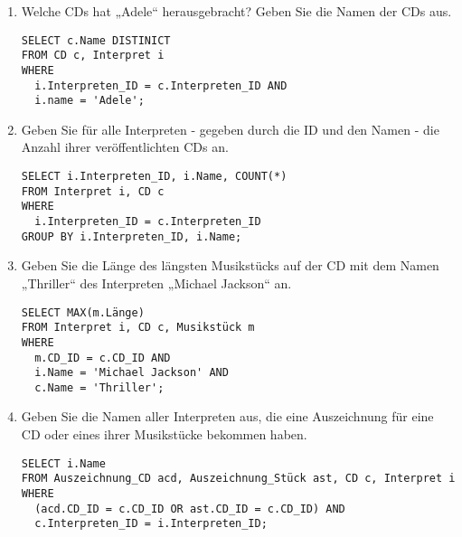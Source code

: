 \documentclass{lehramt-informatik-aufgabe}
\begin{document}
\begin{enumerate}


\item Welche CDs hat „Adele“ herausgebracht? Geben Sie die Namen der CDs
aus.

\begin{antwort}
\begin{verbatim}
SELECT c.Name DISTINICT
FROM CD c, Interpret i
WHERE
  i.Interpreten_ID = c.Interpreten_ID AND
  i.name = 'Adele';
\end{verbatim}
\end{antwort}


\item Geben Sie für alle Interpreten - gegeben durch die ID und den
Namen - die Anzahl ihrer veröffentlichten CDs an.

\begin{antwort}
\begin{verbatim}
SELECT i.Interpreten_ID, i.Name, COUNT(*)
FROM Interpret i, CD c
WHERE
  i.Interpreten_ID = c.Interpreten_ID
GROUP BY i.Interpreten_ID, i.Name;
\end{verbatim}
\end{antwort}


\item Geben Sie die Länge des längsten Musikstücks auf der CD mit dem
Namen „Thriller“ des Interpreten „Michael Jackson“ an.

\begin{antwort}
\begin{verbatim}
SELECT MAX(m.Länge)
FROM Interpret i, CD c, Musikstück m
WHERE
  m.CD_ID = c.CD_ID AND
  i.Name = 'Michael Jackson' AND
  c.Name = 'Thriller';
\end{verbatim}
\end{antwort}


\item Geben Sie die Namen aller Interpreten aus, die eine Auszeichnung
für eine CD oder eines ihrer Musikstücke bekommen haben.

\begin{antwort}
\begin{verbatim}
SELECT i.Name
FROM Auszeichnung_CD acd, Auszeichnung_Stück ast, CD c, Interpret i
WHERE
  (acd.CD_ID = c.CD_ID OR ast.CD_ID = c.CD_ID) AND
  c.Interpreten_ID = i.Interpreten_ID;
\end{verbatim}
\end{antwort}


\end{enumerate}
\end{document}
